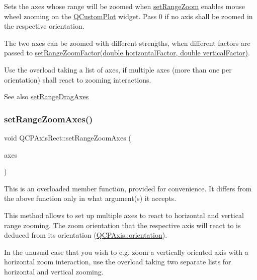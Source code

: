 Sets the axes whose range will be zoomed when \hyperlink{class_q_c_p_axis_rect_a7960a9d222f1c31d558b064b60f86a31}{set\+Range\+Zoom} enables mouse wheel zooming on the \hyperlink{class_q_custom_plot}{Q\+Custom\+Plot} widget. Pass 0 if no axis shall be zoomed in the respective orientation.

The two axes can be zoomed with different strengths, when different factors are passed to \hyperlink{class_q_c_p_axis_rect_a895d7ac745ea614e04056244b3c138ac}{set\+Range\+Zoom\+Factor(double horizontal\+Factor, double vertical\+Factor)}.

Use the overload taking a list of axes, if multiple axes (more than one per orientation) shall react to zooming interactions.

\begin{DoxySeeAlso}{See also}
\hyperlink{class_q_c_p_axis_rect_a648cce336bd99daac4a5ca3e5743775d}{set\+Range\+Drag\+Axes} 
\end{DoxySeeAlso}
\mbox{\label{class_q_c_p_axis_rect_a07a41be4eda0d42abe49475e9fa38b92}} 
\subsubsection{\texorpdfstring{set\+Range\+Zoom\+Axes()}{setRangeZoomAxes()}\hspace{0.1cm}{\footnotesize\ttfamily [2/3]}}
{\footnotesize\ttfamily void Q\+C\+P\+Axis\+Rect\+::set\+Range\+Zoom\+Axes (\begin{DoxyParamCaption}\item[{Q\+List$<$ \hyperlink{class_q_c_p_axis}{Q\+C\+P\+Axis} $\ast$$>$}]{axes }\end{DoxyParamCaption})}

This is an overloaded member function, provided for convenience. It differs from the above function only in what argument(s) it accepts.

This method allows to set up multiple axes to react to horizontal and vertical range zooming. The zoom orientation that the respective axis will react to is deduced from its orientation (\hyperlink{class_q_c_p_axis_ab988ef4538e2655bb77bd138189cd42e}{Q\+C\+P\+Axis\+::orientation}).

In the unusual case that you wish to e.\+g. zoom a vertically oriented axis with a horizontal zoom interaction, use the overload taking two separate lists for horizontal and vertical zooming. \mbox{\label{class_q_c_p_axis_rect_ae85a63a856e111def77437812c3acc99}} 
